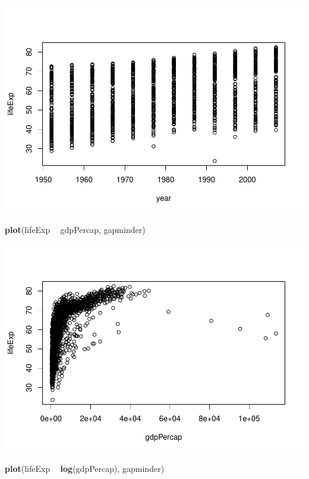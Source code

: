 \documentclass[
]{book}
\newenvironment{Shaded}{\begin{snugshade}}{\end{snugshade}}
\newcommand{\KeywordTok}[1]{\textcolor[rgb]{0.13,0.29,0.53}{\textbf{#1}}}
\newcommand{\NormalTok}[1]{#1}
\newcommand{\OperatorTok}[1]{\textcolor[rgb]{0.81,0.36,0.00}{\textbf{#1}}}
\newcommand{\StringTok}[1]{\textcolor[rgb]{0.31,0.60,0.02}{#1}}
\begin{document}
\includegraphics{05_data-care-feeding_files/figure-latex/first-plots-base-R-1.pdf}

\begin{Shaded}
\begin{Highlighting}[]
\KeywordTok{plot}\NormalTok{(lifeExp }\OperatorTok{~}\StringTok{ }\NormalTok{gdpPercap, gapminder)}
\end{Highlighting}
\end{Shaded}

\includegraphics{05_data-care-feeding_files/figure-latex/first-plots-base-R-2.pdf}

\begin{Shaded}
\begin{Highlighting}[]
\KeywordTok{plot}\NormalTok{(lifeExp }\OperatorTok{~}\StringTok{ }\KeywordTok{log}\NormalTok{(gdpPercap), gapminder)}
\end{Highlighting}
\end{Shaded}
\end{document}
